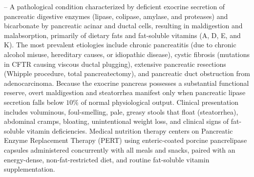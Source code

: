 -- A pathological condition characterized by deficient exocrine secretion of pancreatic digestive enzymes (lipase, colipase, amylase, and proteases) and bicarbonate by pancreatic acinar and ductal cells, resulting in maldigestion and malabsorption, primarily of dietary fats and fat-soluble vitamins (A, D, E, and K). The most prevalent etiologies include chronic pancreatitis (due to chronic alcohol misuse, hereditary causes, or idiopathic disease), cystic fibrosis (mutations in CFTR causing viscous ductal plugging), extensive pancreatic resections (Whipple procedure, total pancreatectomy), and pancreatic duct obstruction from adenocarcinoma. Because the exocrine pancreas possesses a substantial functional reserve, overt maldigestion and steatorrhea manifest only when pancreatic lipase secretion falls below $10\%$ of normal physiological output. Clinical presentation includes voluminous, foul-smelling, pale, greasy stools that float (steatorrhea), abdominal cramps, bloating, unintentional weight loss, and clinical signs of fat-soluble vitamin deficiencies. Medical nutrition therapy centers on Pancreatic Enzyme Replacement Therapy (PERT) using enteric-coated porcine pancrelipase capsules administered concurrently with all meals and snacks, paired with an energy-dense, non-fat-restricted diet, and routine fat-soluble vitamin supplementation.

